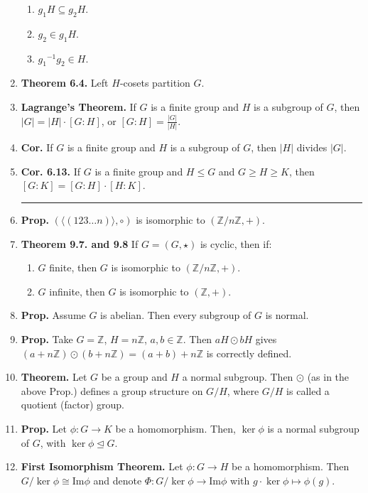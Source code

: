 \begin{enumerate}
\begin{enumerate}
		\item $g_1H \subseteq g_2H$. 
		\item $g_2 \in g_1H$. 
		\item ${g_1}^{-1}g_2 \in H$. 
	\end{enumerate} 
	\item \textbf{Theorem 6.4. } Left $H$-cosets partition $G$. 
	\item \textbf{Lagrange's Theorem. } If $G$ is a finite group and $H$ is a subgroup of $G$, then $|G| = |H| \cdot [G:H]$, or $[G:H] = \frac{|G|}{|H|}$. 
	\item \textbf{Cor. } If $G$ is a finite group and $H$ is a subgroup of $G$, then $|H|$ divides $|G|$. 
	\item \textbf{Cor. 6.13. } If $G$ is a finite group and $H \leq G$ and $G \geq H \geq K$, then $[G:K] = [G:H] \cdot [H:K]$.
	\begin{center}
		\hrule
	\end{center}
	\item \textbf{Prop. } $(\langle (123 \dots n) \rangle, \circ)$ is isomorphic to $(\mathbb{Z}/n\mathbb{Z},+)$. 
	\item \textbf{Theorem 9.7. and 9.8} If $G = (G, \star)$ is cyclic, then if: 
	\begin{enumerate}
		\item $G$ finite, then $G$ is isomorphic to $(\mathbb{Z}/n\mathbb{Z}, +)$. 
		\item $G$ infinite, then $G$ is isomorphic to $(\mathbb{Z},+)$. 
	\end{enumerate}
	\item \textbf{Prop. } Assume $G$ is abelian. Then every subgroup of $G$ is normal. 
	\item \textbf{Prop. } Take $G = \mathbb{Z}$, $H = n\mathbb{Z}$, $a,b \in \mathbb{Z}$. Then $aH \odot bH$ gives $(a+n\mathbb{Z}) \odot (b+n\mathbb{Z}) = (a + b) + n\mathbb{Z}$ is correctly defined. 
	\item \textbf{Theorem. } Let $G$ be a group and $H$ a normal subgroup. Then $\odot$ (as in the above Prop.) defines a group structure on $G/H$, where $G/H$ is called a quotient (factor) group. 
	\item \textbf{Prop. } Let $\phi: G \to K$ be a homomorphism. Then, $\ker \phi$ is a normal subgroup of $G$, with $\ker\phi \unlhd G$. 
	\item \textbf{First Isomorphism Theorem. } Let $\phi: G \to H$ be a homomorphism. Then $G/\ker\phi \cong \textrm{Im}\phi$ and denote $\Phi: G/\ker\phi \to \textrm{Im}\phi$ with $g \cdot \ker\phi \mapsto \phi(g)$. 

\end{enumerate}
